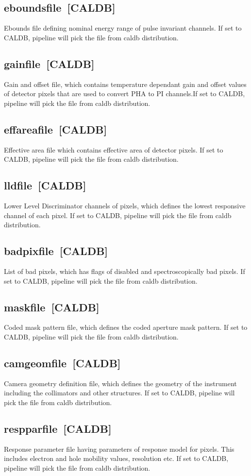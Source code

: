 \documentclass[11pt,oneside,a4paper]{article}
\begin{document}
\subsection*{eboundsfile~[CALDB]}
    Ebounds file defining nominal energy range of pulse invariant channels. If set 
to CALDB, pipeline will pick the file from caldb distribution.
\subsection*{gainfile~[CALDB]}
    Gain and offset file, which contains temperature dependant gain and offset values 
of detector pixels that are used to convert PHA to PI channels.If set 
to CALDB, pipeline will pick the file from caldb distribution.
\subsection*{effareafile~[CALDB]}
    Effective area file which contains effective area of detector pixels. If set 
to CALDB, pipeline will pick the file from caldb distribution.
\subsection*{lldfile~[CALDB]}
    Lower Level Discriminator channels of pixels, which defines the lowest 
responsive channel of each pixel. If set 
to CALDB, pipeline will pick the file from caldb distribution.
\subsection*{badpixfile~[CALDB]}
    List of bad pixels, which has flags of disabled and spectroscopically bad pixels.
If set 
to CALDB, pipeline will pick the file from caldb distribution. 
\subsection*{maskfile~[CALDB]}
    Coded mask pattern file, which defines the coded aperture mask pattern. If set 
to CALDB, pipeline will pick the file from caldb distribution.
\subsection*{camgeomfile~[CALDB]}
    Camera geometry definition file, which defines the geometry of the instrument 
including the collimators and other structures. If set 
to CALDB, pipeline will pick the file from caldb distribution.
\subsection*{respparfile~[CALDB]}
    Response parameter file having parameters of response model for pixels. This includes 
electron and hole mobility values, resolution etc. If set 
to CALDB, pipeline will pick the file from caldb distribution.
\end{document}
